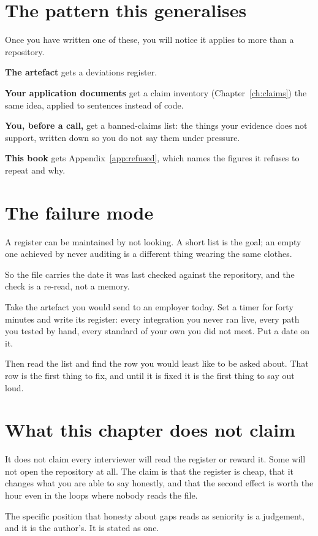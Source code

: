 \section{The pattern this generalises}

Once you have written one of these, you will notice it applies to more than a
repository.

\begin{kitmethod}
\textbf{The artefact} gets a deviations register.

\textbf{Your application documents} get a claim inventory
(Chapter~\ref{ch:claims}) \dash{} the same idea, applied to sentences instead of
code.

\textbf{You, before a call,} get a banned-claims list: the things your evidence
does not support, written down so you do not say them under pressure.

\textbf{This book} gets Appendix~\ref{app:refused}, which names the figures it
refuses to repeat and why.
\end{kitmethod}


\section{The failure mode}

A register can be maintained by not looking. A short list is the goal; an empty
one achieved by never auditing is a different thing wearing the same clothes.

So the file carries the date it was last checked against the repository, and the
check is a re-read, not a memory. 

\begin{drill}
Take the artefact you would send to an employer today. Set a timer for forty
minutes and write its register: every integration you never ran live, every
path you tested by hand, every standard of your own you did not meet. Put a
date on it.

Then read the list and find the row you would least like to be asked about.
That row is the first thing to fix, and until it is fixed it is the first thing
to say out loud.
\end{drill}

\section*{What this chapter does not claim}

It does not claim every interviewer will read the register or reward it. Some
will not open the repository at all. The claim is that the register is cheap,
that it changes what you are able to say honestly, and that the second effect
is worth the hour even in the loops where nobody reads the file.

The specific position that honesty about gaps reads as seniority is a
judgement, and it is the author's. It is stated as one.
